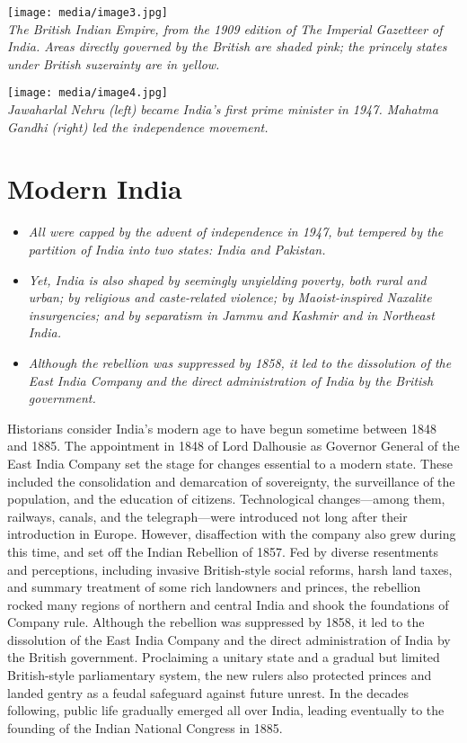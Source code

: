 \texttt{[image: media/image3.jpg]}\\
\emph{The British Indian Empire, from the 1909 edition of The Imperial
Gazetteer of India. Areas directly governed by the British are shaded
pink; the princely states under British suzerainty are in yellow.}

\texttt{[image: media/image4.jpg]}\\
\emph{Jawaharlal Nehru (left) became India's first prime minister in
1947. Mahatma Gandhi (right) led the independence movement.}

\section{Modern India}\label{modern-india}

\begin{itemize}
\item
  \emph{All were capped by the advent of independence in 1947, but
  tempered by the partition of India into two states: India and
  Pakistan.}
\item
  \emph{Yet, India is also shaped by seemingly unyielding poverty, both
  rural and urban; by religious and caste-related violence; by
  Maoist-inspired Naxalite insurgencies; and by separatism in Jammu and
  Kashmir and in Northeast India.}
\item
  \emph{Although the rebellion was suppressed by 1858, it led to the
  dissolution of the East India Company and the direct administration of
  India by the British government.}
\end{itemize}

Historians consider India's modern age to have begun sometime between
1848 and 1885. The appointment in 1848 of Lord Dalhousie as Governor
General of the East India Company set the stage for changes essential to
a modern state. These included the consolidation and demarcation of
sovereignty, the surveillance of the population, and the education of
citizens. Technological changes---among them, railways, canals, and the
telegraph---were introduced not long after their introduction in Europe.
However, disaffection with the company also grew during this time, and
set off the Indian Rebellion of 1857. Fed by diverse resentments and
perceptions, including invasive British-style social reforms, harsh land
taxes, and summary treatment of some rich landowners and princes, the
rebellion rocked many regions of northern and central India and shook
the foundations of Company rule. Although the rebellion was suppressed
by 1858, it led to the dissolution of the East India Company and the
direct administration of India by the British government. Proclaiming a
unitary state and a gradual but limited British-style parliamentary
system, the new rulers also protected princes and landed gentry as a
feudal safeguard against future unrest. In the decades following, public
life gradually emerged all over India, leading eventually to the
founding of the Indian National Congress in 1885.

